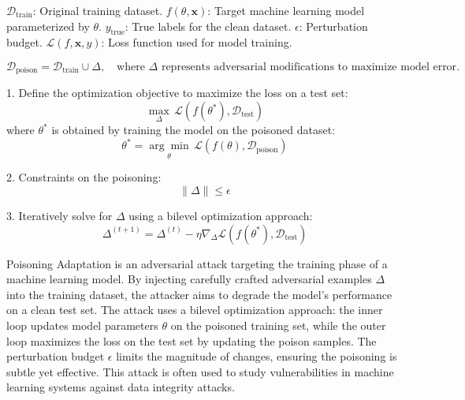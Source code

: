 
$\mathcal{D}_{\text{train}}$: Original training dataset.  
$f(\theta, \mathbf{x})$: Target machine learning model parameterized by $\theta$.  
$y_{\text{true}}$: True labels for the clean dataset.  
$\epsilon$: Perturbation budget.  
$\mathcal{L}(f, \mathbf{x}, y)$: Loss function used for model training.

\[
\mathcal{D}_{\text{poison}} = \mathcal{D}_{\text{train}} \cup \Delta, \quad \text{where } \Delta \text{ represents adversarial modifications to maximize model error}.
\]

1. Define the optimization objective to maximize the loss on a test set:  
\[
\max_{\Delta} \, \mathcal{L}(f(\theta^*), \mathcal{D}_{\text{test}})
\]
where $\theta^*$ is obtained by training the model on the poisoned dataset:
\[
\theta^* = \underset{\theta}{\arg \min} \, \mathcal{L}(f(\theta), \mathcal{D}_{\text{poison}})
\]

2. Constraints on the poisoning:
\[
\|\Delta\| \leq \epsilon
\]

3. Iteratively solve for $\Delta$ using a bilevel optimization approach:
\[
\Delta^{(t+1)} = \Delta^{(t)} - \eta \nabla_\Delta \mathcal{L}(f(\theta^*), \mathcal{D}_{\text{test}})
\]

Poisoning Adaptation is an adversarial attack targeting the training phase of a machine learning model. By injecting carefully crafted adversarial examples $\Delta$ into the training dataset, the attacker aims to degrade the model's performance on a clean test set. The attack uses a bilevel optimization approach: the inner loop updates model parameters $\theta$ on the poisoned training set, while the outer loop maximizes the loss on the test set by updating the poison samples. The perturbation budget $\epsilon$ limits the magnitude of changes, ensuring the poisoning is subtle yet effective. This attack is often used to study vulnerabilities in machine learning systems against data integrity attacks.